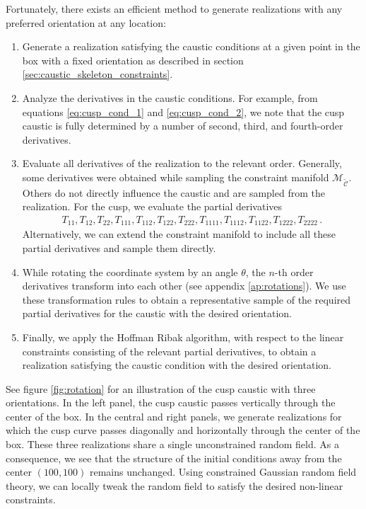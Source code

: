 \documentclass[a4paper, 11pt]{article}
\begin{document}
Fortunately, there exists an efficient method to generate realizations with any preferred orientation at any location:
\begin{enumerate}
\item 
Generate a realization satisfying the caustic conditions at a given point in the box with a fixed orientation as described in section \ref{sec:caustic_skeleton_constraints}. 
\item 
Analyze the derivatives in the caustic conditions. For example, from equations \eqref{eq:cusp_cond_1} and \eqref{eq:cusp_cond_2}, we note that the cusp caustic is fully determined by a number of second, third, and fourth-order derivatives.
\item
Evaluate all derivatives of the realization to the relevant order. Generally, some derivatives were obtained while sampling the constraint manifold $\mathcal{M}_\mathcal{\tilde C}$. Others do not directly influence the caustic and are sampled from the realization. For the cusp, we evaluate the partial derivatives 
\begin{align}
T_{11},T_{12},T_{22},T_{111},T_{112},T_{122},T_{222},T_{1111},T_{1112},T_{1122},T_{1222},T_{2222}\,.
\end{align}
Alternatively, we can extend the constraint manifold to include all these partial derivatives and sample them directly.
\item 
While rotating the coordinate system by an angle $\theta$, the $n$-th order derivatives transform into each other (see appendix \ref{ap:rotations}). We use these transformation rules to obtain a representative sample of the required partial derivatives for the caustic with the desired orientation.
\item 
Finally, we apply the Hoffman Ribak algorithm, with respect to the linear constraints consisting of the relevant partial derivatives, to obtain a realization satisfying the caustic condition with the desired orientation.
\end{enumerate}

See figure \ref{fig:rotation} for an illustration of the cusp caustic with three orientations. In the left panel, the cusp caustic passes vertically through the center of the box. In the central and right panels, we generate realizations for which the cusp curve passes diagonally and horizontally through the center of the box. These three realizations share a single unconstrained random field. As a consequence, we see that the structure of the initial conditions away from the center $(100,100)$ remains unchanged. Using constrained Gaussian random field theory, we can locally tweak the random field to satisfy the desired non-linear constraints.
\end{document}
